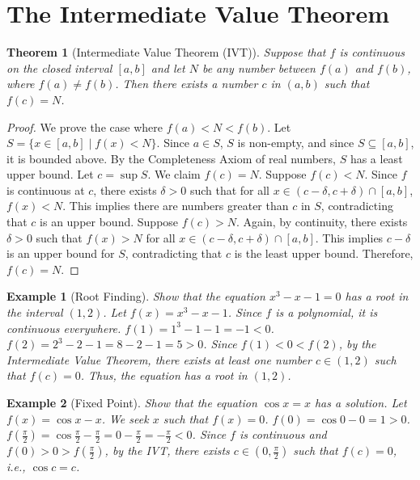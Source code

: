 \documentclass[11pt,a4paper]{article}
\newtheorem{example}{Example}
\newtheorem{theorem}{Theorem}
\begin{document}
\section{The Intermediate Value Theorem}
\begin{theorem}[Intermediate Value Theorem (IVT)]
Suppose that $f$ is continuous on the closed interval $[a, b]$ and let $N$ be any number between $f(a)$ and $f(b)$, where $f(a) \neq f(b)$. Then there exists a number $c$ in $(a, b)$ such that $f(c) = N$.
\end{theorem}
\begin{proof}
We prove the case where $f(a) < N < f(b)$. Let $S = \{x \in [a, b] \mid f(x) < N\}$. Since $a \in S$, $S$ is non-empty, and since $S \subseteq [a, b]$, it is bounded above. By the Completeness Axiom of real numbers, $S$ has a least upper bound. Let $c = \sup S$. We claim $f(c) = N$. Suppose $f(c) < N$. Since $f$ is continuous at $c$, there exists $\delta > 0$ such that for all $x \in (c - \delta, c + \delta) \cap [a, b]$, $f(x) < N$. This implies there are numbers greater than $c$ in $S$, contradicting that $c$ is an upper bound. Suppose $f(c) > N$. Again, by continuity, there exists $\delta > 0$ such that $f(x) > N$ for all $x \in (c - \delta, c + \delta) \cap [a, b]$. This implies $c - \delta$ is an upper bound for $S$, contradicting that $c$ is the least upper bound. Therefore, $f(c) = N$.
\end{proof}
\begin{example}[Root Finding]
Show that the equation $x^3 - x - 1 = 0$ has a root in the interval $(1, 2)$.
Let $f(x) = x^3 - x - 1$. Since $f$ is a polynomial, it is continuous everywhere.
$f(1) = 1^3 - 1 - 1 = -1 < 0$.
$f(2) = 2^3 - 2 - 1 = 8 - 2 - 1 = 5 > 0$.
Since $f(1) < 0 < f(2)$, by the Intermediate Value Theorem, there exists at least one number $c \in (1, 2)$ such that $f(c) = 0$. Thus, the equation has a root in $(1, 2)$.
\end{example}
\begin{example}[Fixed Point]
Show that the equation $\cos x = x$ has a solution.
Let $f(x) = \cos x - x$. We seek $x$ such that $f(x) = 0$.
$f(0) = \cos 0 - 0 = 1 > 0$.
$f(\frac{\pi}{2}) = \cos \frac{\pi}{2} - \frac{\pi}{2} = 0 - \frac{\pi}{2} = -\frac{\pi}{2} < 0$.
Since $f$ is continuous and $f(0) > 0 > f(\frac{\pi}{2})$, by the IVT, there exists $c \in (0, \frac{\pi}{2})$ such that $f(c) = 0$, i.e., $\cos c = c$.
\end{example}
\end{document}

